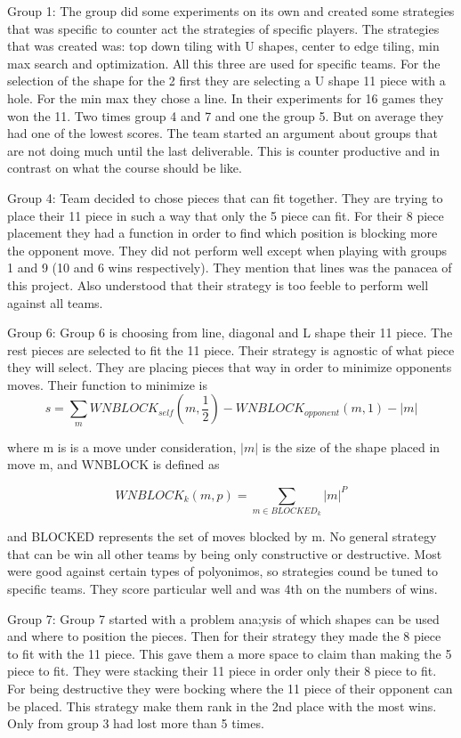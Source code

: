 Group 1:
The group did some experiments on its own and created some strategies that was
specific to counter act the strategies of specific players. The strategies that
was created was: top down tiling with U shapes, center to edge tiling, min max 
search and optimization. All this three are used for specific teams. For the 
selection of the shape for the 2 first they are selecting a U shape 11 piece with
a hole. For the min max they chose a line. In their experiments for 16 games they
won the 11. Two times group 4 and 7 and one the group 5. But on average they had
one of the lowest scores. The team started an argument about groups that are not 
doing much until the last deliverable. This is counter productive and in contrast
on what the course should be like.

Group 4:
Team decided to chose pieces that can fit together. They are trying to place their 
11 piece in such a way that only the 5 piece can fit. For their 8 piece placement 
they had a function in order to find which position is blocking more the opponent
move. They did not perform well except when playing with groups 1 and 9 (10 and 6
wins respectively). They mention that lines was the panacea of this project. Also
understood that their strategy is too feeble to perform well against all teams.

Group 6:
Group 6 is choosing from line, diagonal and L shape their 11 piece. The rest 
pieces are selected to fit the 11 piece. Their strategy is agnostic of what piece
they will select. They are placing pieces that way in order to minimize opponents 
moves. Their function to minimize is 
\begin{equation*}
s = \sum\limits_mWNBLOCK_{self}(m,\frac{1}{2}) - WNBLOCK_{opponent}(m,1) - \lvert m\rvert
\end{equation*}

where m is is a move under consideration, $\lvert m\rvert$ is the size of the shape placed in 
move m, and WNBLOCK is defined as

\begin{equation*}
WNBLOCK_k(m,p) = \sum\limits_{m \in BLOCKED_k} \lvert m\rvert^P
\end{equation*}

and BLOCKED represents the set of moves blocked by m. No general strategy that 
can be win all other teams by being only constructive or destructive. Most were
good against certain types of polyonimos, so strategies cound be tuned to specific 
teams. They score particular well and was 4th on the numbers of wins. 

Group 7:
Group 7 started with a problem ana;ysis of which shapes can be used and where to 
position the pieces. Then for their strategy they made the 8 piece to fit with 
the 11 piece. This gave them a more space to claim than making the 5 piece to fit.
They were stacking their 11 piece in order only their 8 piece to fit. For being
destructive they were bocking where the 11 piece of their opponent can be placed.
This strategy make them rank in the 2nd place with the most wins. Only from group
3 had lost more than 5 times.
